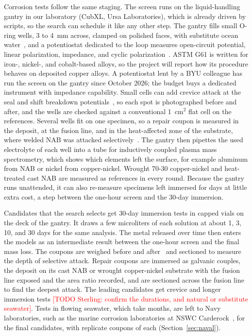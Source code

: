 \documentclass[12pt,letterpaper]{article}
\newcommand{\todo}[1]{\textcolor{red}{[TODO Sterling: #1]}}
\begin{document}
Corrosion tests follow the same staging. The screen runs on the
liquid-handling gantry in our laboratory (CubXL, Ursa Laboratories), which is
already driven by scripts, so the search can schedule it like any other
step. The gantry fills small O-ring wells, 3 to 4~mm across, clamped on
polished faces, with substitute ocean water~\cite{astmD1141}, and a
potentiostat dedicated to the loop measures open-circuit potential, linear
polarization, impedance, and cyclic polarization~\cite{astmG59,astmG61}.
ASTM G61 is written for iron-, nickel-, and cobalt-based alloys, so the
project will report how its procedure behaves on deposited copper alloys.
A potentiostat lent by a BYU colleague has run the screen on the gantry
since October 2026; the budget buys a dedicated instrument with impedance capability.
Small cells can add crevice attack at the seal and shift breakdown
potentials~\cite{frankel1998}, so each spot is photographed before and after,
and the wells are checked against a conventional 1~cm$^2$ flat cell on the
references. Several wells fit on one specimen, so a repair coupon is measured
in the deposit, at the fusion line, and in the heat-affected zone of the
substrate, where welded NAB was attacked selectively~\cite{dobson2024}. The
gantry then pipettes the used electrolyte of each well into a tube for
inductively coupled plasma mass spectrometry, which shows which elements left
the surface, for example aluminum from NAB or nickel from copper-nickel.
Wrought 70-30 copper-nickel and heat-treated cast NAB are measured as
references in every round. Because the gantry runs unattended, it can also
re-measure specimens left immersed for days at little extra cost, a step
between the one-hour screen and the 30-day immersion.

Candidates that the search selects get 30-day immersion tests in capped
vials on the deck of the gantry. It draws a few microliters of each solution
at about 1, 3, 10, and 30 days for the same analysis. The metal released
over time then enters the models as an intermediate result between the
one-hour screen and the final mass loss. The coupons are weighed before and
after~\cite{astmG31,astmG1} and sectioned to measure the depth of selective
attack.
Repair coupons are immersed as galvanic couples, the deposit on its cast NAB or wrought copper-nickel substrate with the fusion line exposed and the area ratio recorded, and are sectioned across the fusion line to find the deepest attack.
The leading candidates get crevice and longer immersion tests \todo{confirm the durations, and natural or substitute seawater}.
Tests in flowing seawater, which take months, are left to Navy laboratories, such as the marine corrosion laboratories at NSWC Carderock~\cite{carderockpartner}, for the final candidates, with replicate coupons of each (Section~\ref{sec:naval}).
\end{document}
